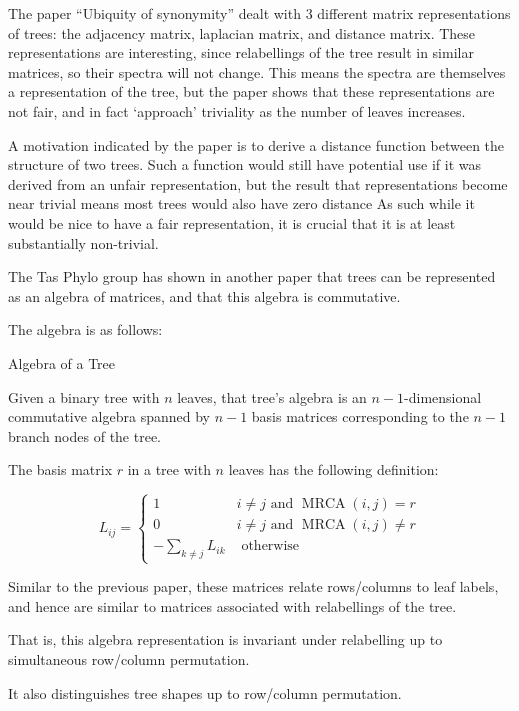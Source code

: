 \documentclass[10pt,a4paper]{report}
\DeclareMathOperator{\MRCA}{MRCA}
\begin{document}
The paper ``Ubiquity of synonymity'' dealt with 3 different matrix
representations of trees: the adjacency matrix, laplacian matrix, and distance
matrix.
These representations are interesting, since relabellings of the tree result
in similar matrices, so their spectra will not change.
This means the spectra are themselves a representation of the tree, but the
paper shows that these representations are not fair, and in fact `approach'
triviality as the number of leaves increases.

A motivation indicated by the paper is to derive a distance function between
the structure of two trees.
Such a function would still have potential use if it was derived from an unfair
representation, but the result that representations become near trivial means
most trees would also have zero distance
As such while it would be nice to have a fair representation, it is crucial
that it is at least substantially non-trivial.

The Tas Phylo group has shown in another paper that trees can be represented as
an algebra of matrices, and that this algebra is commutative.

The algebra is as follows:

\begin{definition} Algebra of a Tree

	Given a binary tree with $n$ leaves, that tree's algebra is an
	$n-1$-dimensional commutative algebra spanned by $n-1$ basis matrices
	corresponding to the $n-1$ branch nodes of the tree.

	The basis matrix $r$ in a tree with $n$ leaves has the following
	definition:
\end{definition}
	\[ L_{ij} = \begin{cases}
		1 & i \neq j \textrm{ and } \MRCA(i, j) = r\\
		0 & i \neq j \textrm{ and } \MRCA(i, j) \neq r\\
		-\sum_{k \neq j} L_{ik} & \textrm{ otherwise}
	\end{cases} \]


Similar to the previous paper, these matrices relate rows/columns to leaf
labels, and hence are similar to matrices associated with relabellings of the
tree.

That is, this algebra representation is invariant under relabelling up to
simultaneous row/column permutation.

It also distinguishes tree shapes up to row/column permutation.
\end{document}
